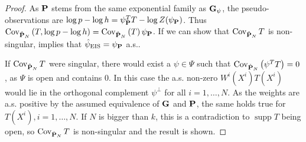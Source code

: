 \begin{proof}
   As $\P$ stems from the same exponential family as $\G_{\psi}$, the pseudo-observations are $\log p - \log h = \psi_{\P}^T T - \log Z(\psi_{\P})$. Thus $\cov_{\hat \P_{N}} \left( T, \log p - \log h \right) = \cov_{\hat \P_{N}} \left( T \right)\psi_{\P}$. 
   If we can show that $\cov_{\hat\P_{N}} T$ is non-singular,  implies that $\hpeis = \psi_{\P}$ a.s.. 

   If $\cov_{\hat \P_{N}} T$ were singular, there would exist a $\psi \in \Psi$ such that $\cov_{\hat \P_{N}} \left( \psi^{T}T \right) = 0$, as $\Psi$ is open and contains $0$. In this case the a.s. non-zero $W^{i}(X^{i}) T(X^{i})$ would lie in the orthogonal complement $\psi^{\perp}$ for all $i = 1, \dots, N$. As the weights are a.s. positive by the assumed equivalence of $\G$ and $\P$, the same holds true for $T(X^{i}), i = 1,\dots, N$.
   If $N$ is bigger than $k$, this is a contradiction to $\operatorname{supp} T $ being open, so $\cov_{\hat \P_{N}} T$ is non-singular and the result is shown.
    
\end{proof}

\begin{theorem}
    \label{thm:eis-consistent}
\end{theorem}

